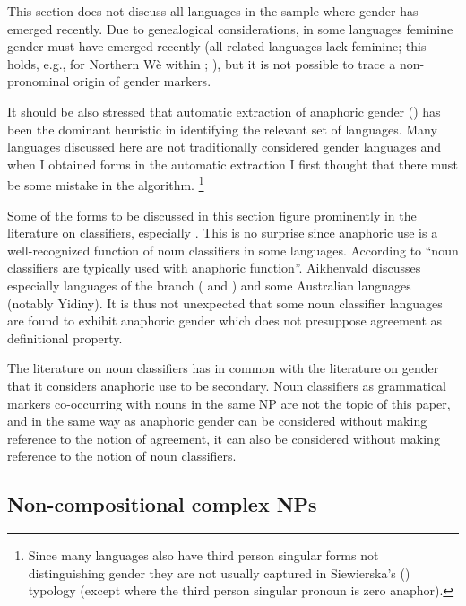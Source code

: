 \documentclass[output=collectionpaper]{langsci/langscibook}
\begin{document}
This section does not discuss all languages in the sample where gender has emerged recently. Due to genealogical considerations, in some languages feminine gender must have emerged recently (all related languages lack feminine; this holds, e.g., for Northern Wè within ; \citealt{Paradis1983}), but it is not possible to trace a non-pronominal origin of gender markers.

It should be also stressed that automatic extraction of anaphoric gender () has been the dominant heuristic in identifying the relevant set of languages. Many languages discussed here are not traditionally considered gender languages and when I obtained forms in the automatic extraction I first thought that there must be some mistake in the algorithm.%
\footnote{%
Since many languages also have third person singular forms not distinguishing gender they are not usually captured in Siewierska’s (\citeyear{Siewierska2005}) typology (except  where the third person singular pronoun is zero anaphor).
}%

Some of the forms to be discussed in this section figure prominently in the literature on classifiers, especially . This is no surprise since anaphoric use is a well-recognized function of noun classifiers in some languages. According to \citet[87]{Aikhenvald2000} “noun classifiers are typically used with anaphoric function”. Aikhenvald discusses especially  languages of the  branch ( and ) and some Australian languages (notably Yidiny). It is thus not unexpected that some noun classifier languages are found to exhibit anaphoric gender which does not presuppose agreement as definitional property.

The literature on noun classifiers has in common with the literature on gender that it considers anaphoric use to be secondary. Noun classifiers as grammatical markers co-occurring with nouns in the same NP are not the topic of this paper, and in the same way as anaphoric gender can be considered without making reference to the notion of agreement, it can also be considered without making reference to the notion of noun classifiers.


\subsection{Non-compositional complex NPs}
\label{sec:BW:5.2}
\end{document}
